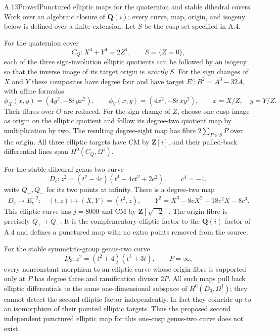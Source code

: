 \begin{statement}{A.13}{Proved}{Punctured elliptic maps for the quaternion and stable dihedral covers}
Work over an algebraic closure of $\mathbf Q(i)$; every curve, map,
origin, and isogeny below is defined over a finite extension.
Let $S$ be the cusp set specified in A.4.

For the quaternion cover
\[
 C_Q:X^4+Y^4=2Z^4,\qquad S=\{Z=0\},
\]
each of the three sign-involution elliptic quotients can be followed
by an isogeny so that the inverse image of its target origin is
\emph{exactly} $S$. For the sign changes of $X$ and $Y$ these
composites have degree four and have target
$E':B^2=A^3-32A$, with affine formulas
\[
 \phi_X(x,y)=(4y^2,-8i\,yx^2),\qquad
 \phi_Y(x,y)=(4x^2,-8i\,xy^2),\qquad x=X/Z,\quad y=Y/Z.
                                                        \tag{A.13.1}
\]
Their fibres over $O$ are reduced. For the sign change of $Z$,
choose one cusp image as origin on the elliptic quotient and
follow its degree-two quotient map by multiplication by two.
The resulting degree-eight map has fibre $2\sum_{P\in S}P$
over the origin. All three elliptic targets have CM by
$\mathbf Z[i]$, and their pulled-back differential lines span
$H^0(C_Q,\Omega^1)$.

For the stable dihedral genus-two curve
\[
 D_c:z^2=(t^2-4c)(t^4-4ct^2+2c^2),\qquad c^4=-1,
\]
write $Q_+,Q_-$ for its two points at infinity. There is a
degree-two map
\[
 D_c\longrightarrow E_c^{-2}:\quad (t,z)\longmapsto(X,Y)=(t^2,z),
 \qquad
 Y^2=X^3-8cX^2+18c^2X-8c^3.                         \tag{A.13.2}
\]
This elliptic curve has $j=8000$ and CM by
$\mathbf Z[\sqrt{-2}]$. The origin fibre is precisely
$Q_++Q_-$. It is the complementary elliptic factor to the
$\mathbf Q(i)$ factor of A.4 and defines a punctured map with
no extra points removed from the source.

For the stable symmetric-group genus-two curve
\[
 D_3:z^2=(t^2+4)(t^3+3t),\qquad P=\infty,
\]
every nonconstant morphism to an elliptic curve whose origin fibre
is supported only at $P$ has degree three and ramification divisor
$2P$. All such maps pull back elliptic differentials to the same
one-dimensional subspace of $H^0(D_3,\Omega^1)$; they cannot detect
the second elliptic factor independently. In fact they coincide
up to an isomorphism of their pointed elliptic targets.
Thus the proposed second independent punctured elliptic map
for this one-cusp genus-two curve does not exist.
\end{statement}
